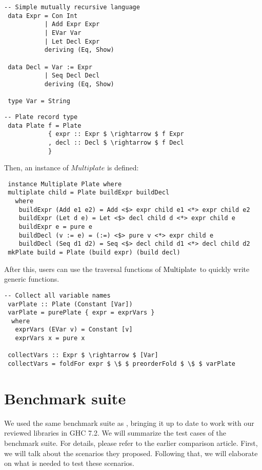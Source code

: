 \documentclass[twocolumn,11pt,a4paper]{article}
\newcommand{\multiplate}{\textcolor{black}{Multiplate}}
\begin{document}
\begin{lstlisting}
-- Simple mutually recursive language
 data Expr = Con Int
           | Add Expr Expr
           | EVar Var
           | Let Decl Expr
           deriving (Eq, Show)
 
 data Decl = Var := Expr
           | Seq Decl Decl
           deriving (Eq, Show)
 
 type Var = String
\end{lstlisting}
\begin{lstlisting}[mathescape=true]
-- Plate record type
 data Plate f = Plate
            { expr :: Expr $ \rightarrow $ f Expr
            , decl :: Decl $ \rightarrow $ f Decl
            }
\end{lstlisting}

Then, an instance of $ Multiplate $ is defined:

\begin{lstlisting}
 instance Multiplate Plate where
 multiplate child = Plate buildExpr buildDecl
   where
    buildExpr (Add e1 e2) = Add <$> expr child e1 <*> expr child e2
    buildExpr (Let d e) = Let <$> decl child d <*> expr child e
    buildExpr e = pure e
    buildDecl (v := e) = (:=) <$> pure v <*> expr child e
    buildDecl (Seq d1 d2) = Seq <$> decl child d1 <*> decl child d2
 mkPlate build = Plate (build expr) (build decl)
\end{lstlisting}

After this, users can use the traversal functions of \multiplate\ to quickly write generic functions.

\begin{lstlisting}[mathescape=true]
-- Collect all variable names
 varPlate :: Plate (Constant [Var])
 varPlate = purePlate { expr = exprVars }
  where
   exprVars (EVar v) = Constant [v]
   exprVars x = pure x
   
 collectVars :: Expr $ \rightarrow $ [Var]
 collectVars = foldFor expr $ \$ $ preorderFold $ \$ $ varPlate
\end{lstlisting}

\section{Benchmark suite}\label{benchmark}

We used the same benchmark suite as \citet{Rodriguez:2008:art}, bringing it up to date to work with our reviewed libraries in GHC 7.2. We will summarize the test cases of the benchmark suite. For details, please refer to the earlier comparison article.
First, we will talk about the scenarios they proposed. Following that, we will elaborate on what is needed to test these scenarios.
\end{document}
